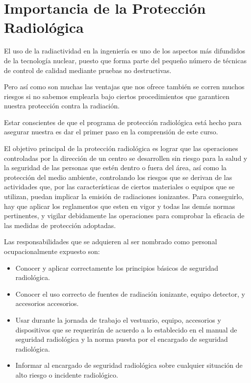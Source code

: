 \chapter{Importancia de la Protecci\'on Radiol\'ogica}

El uso de la radiactividad en la ingenier\'ia es uno de los aspectos m\'as difundidos de la tecnolog\'ia nuclear, puesto que forma parte del pequeño número de t\'ecnicas de control de calidad mediante pruebas no destructivas.

Pero as\'i como son muchas las ventajas que nos ofrece tambi\'en se corren muchos riesgos si no sabemos emplearla bajo ciertos procedimientos que garanticen nuestra protecci\'on contra la radiaci\'on.

Estar conscientes de que el programa de protecci\'on radiol\'ogica est\'a hecho para asegurar nuestra es dar el primer paso en la comprensi\'on de este curso.

El objetivo principal de la protecci\'on radiol\'ogica es lograr que las operaciones controladas por la direcci\'on de un centro se desarrollen sin riesgo para la salud y la seguridad de las personas que estén dentro o fuera del \'area, as\'i como la protecci\'on del medio ambiente, controlando los riesgos que se derivan de las actividades que, por las caracter\'isticas de ciertos materiales o equipos que se utilizan, puedan implicar la emisi\'on de radiaciones ionizantes. Para conseguirlo, hay que aplicar los reglamentos que esten en vigor y todas las dem\'as normas pertinentes, y vigilar debidamente las operaciones para comprobar la eficacia de las medidas de protecci\'on adoptadas.

Las responsabilidades que se adquieren al ser nombrado como personal ocupacionalmente expuesto son:
\begin{itemize}
  \item Conocer y aplicar correctamente los principios b\'asicos de seguridad radiol\'ogica.
  \item Conocer el uso correcto de fuentes de radiaci\'on ionizante, equipo detector, y accesorios accesorios.
  \item Usar durante la jornada de trabajo el vestuario, equipo, accesorios y dispositivos que se requerir\'an de acuerdo a lo establecido en el manual de seguridad radiol\'ogica y la norma puesta por el encargado de seguridad radiol\'ogica.
  \item Informar al encargado de seguridad radiol\'ogica sobre cualquier situaci\'on de alto riesgo o incidente radiol\'ogico.
\end{itemize}

